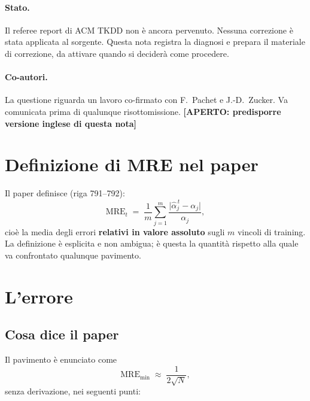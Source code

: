 \documentclass[11pt,a4paper]{article}
\newcommand{\MRE}{\mathrm{MRE}}
\newcommand{\OPEN}[1]{\textcolor{orange!80!black}{\textbf{[APERTO: #1]}}}
\begin{document}
\paragraph{Stato.} Il referee report di ACM TKDD non è ancora
pervenuto. Nessuna correzione è stata applicata al sorgente. Questa
nota registra la diagnosi e prepara il materiale di correzione, da
attivare quando si deciderà come procedere.

\paragraph{Co-autori.} La questione riguarda un lavoro co-firmato con
F.~Pachet e J.-D.~Zucker. Va comunicata prima di qualunque
risottomissione. \OPEN{predisporre versione inglese di questa nota}

\section{Definizione di MRE nel paper}

Il paper definisce (riga 791--792):
\begin{equation}
  \MRE_t \;=\; \frac{1}{m}\sum_{j=1}^{m}
  \frac{\bigl|\hat\alpha_j^{\,t}-\alpha_j\bigr|}{\alpha_j},
  \label{eq:mre}
\end{equation}
cioè la media degli errori \textbf{relativi in valore assoluto} sugli
$m$ vincoli di training. La definizione è esplicita e non ambigua; è
questa la quantità rispetto alla quale va confrontato qualunque
pavimento.

\section{L'errore}

\subsection{Cosa dice il paper}

Il pavimento è enunciato come
\begin{equation}
  \MRE_{\min} \;\approx\; \frac{1}{2\sqrt{N}} ,
  \label{eq:floor_paper}
\end{equation}
senza derivazione, nei seguenti punti:
\end{document}
